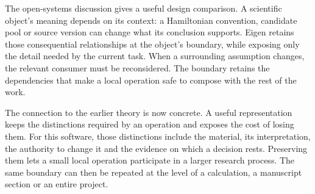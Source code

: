 The open-systems discussion gives a useful design comparison. A scientific object's meaning depends on its context: a Hamiltonian convention, candidate pool or source version can change what its conclusion supports. Eigen retains those consequential relationships at the object's boundary, while exposing only the detail needed by the current task. When a surrounding assumption changes, the relevant consumer must be reconsidered. The boundary retains the dependencies that make a local operation safe to compose with the rest of the work.

The connection to the earlier theory is now concrete. A useful representation keeps the distinctions required by an operation and exposes the cost of losing them. For this software, those distinctions include the material, its interpretation, the authority to change it and the evidence on which a decision rests. Preserving them lets a small local operation participate in a larger research process. The same boundary can then be repeated at the level of a calculation, a manuscript section or an entire project.
